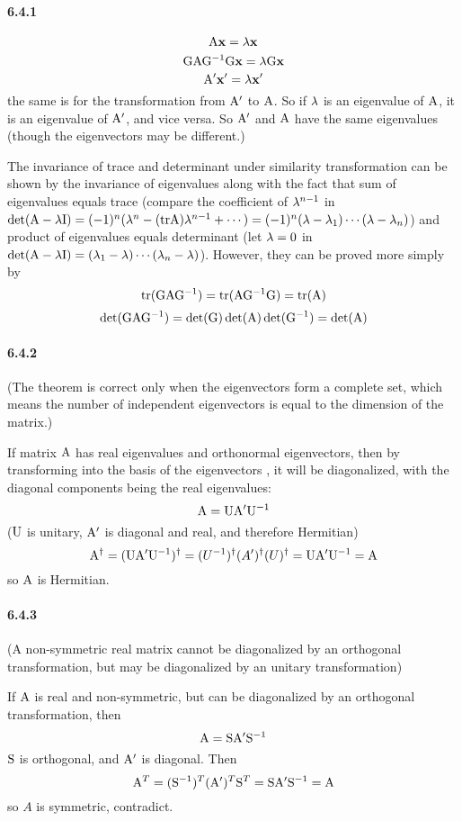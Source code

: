 \documentclass[a4paper]{article}
\begin{document}
\paragraph{6.4.1}
\[
\mathrm{A}\mathbf{x}=\lambda\mathbf{x}
\]
\[
\mathrm{G}\mathrm{A}\mathrm{G}^{-1}\mathrm{G}\mathbf{x}=\lambda\mathrm{G}\mathbf{x}
\]
\[
\mathrm{A}'\mathbf{x}'=\lambda\mathbf{x}'
\]
the same is for the transformation from $\mathrm{A}'$ to $\mathrm{A}$. So if $\lambda$ is an eigenvalue of $\mathrm{A}$, it is an eigenvalue of $\mathrm{A}'$, and vice versa. So $\mathrm{A}'$ and $\mathrm{A}$ have the same eigenvalues (though the eigenvectors may be different.)

The invariance of trace and determinant under similarity transformation can be shown by the invariance of eigenvalues along with the fact that sum of eigenvalues equals trace (compare the coefficient of $\lambda^{n-1}$ in $\det(\mathrm{A}-\lambda \mathrm{I})=(-1)^n(\lambda^n-(\mathrm{tr} \mathrm{A})\lambda^{n-1}+\cdots)=(-1)^n(\lambda-\lambda_1)\cdots(\lambda-\lambda_n)$\;) and product of eigenvalues equals determinant (let $\lambda=0$ in $\det(\mathrm{A}-\lambda \mathrm{I})=(\lambda_1-\lambda)\cdots(\lambda_n-\lambda)$). However, they can be proved more simply by
\newcommand{\tr}{\mathrm{tr}}
\[
\tr(\M{G}\M{A}\M{G}^{-1})=\tr(\M{A}\M{G}^{-1}\M{G})=\tr(\M{A})
\]
\[
\det(\mathrm{G}\mathrm{A}\mathrm{G}^{-1})=\det(\mathrm{G})\det(\mathrm{A})\det(\mathrm{G}^{-1})=\det(\mathrm{A})
\]

\paragraph{6.4.2}
(The theorem is correct only when the eigenvectors form a complete set, which means the number of independent eigenvectors is equal to the dimension of the matrix.)

If matrix $\mathrm{A}$ has real eigenvalues and orthonormal eigenvectors, then by transforming into the basis of the eigenvectors , it will be diagonalized, with the diagonal components being the real eigenvalues:
\[
\mathrm{A}=\mathrm{U}\mathrm{A'}\mathrm{U}^{-1}
\]
($\mathrm{U}$ is unitary, $\mathrm{A'}$ is diagonal and real, and therefore Hermitian)
\[
\mathrm{A}^\dagger=(\mathrm{U}\mathrm{A'}\mathrm{U}^{-1})^\dagger=(U^{-1})^\dagger(A')^\dagger(U)^\dagger=\mathrm{U}\mathrm{A'}\mathrm{U}^{-1}=\mathrm{A}
\]
so $\mathrm{A}$ is Hermitian.

\paragraph{6.4.3}
(A non-symmetric real matrix cannot be diagonalized by an orthogonal transformation, but may be diagonalized by an unitary transformation)

If $\mathrm{A}$ is real and non-symmetric, but can be diagonalized by an orthogonal transformation, then
\[
\mathrm{A}=\mathrm{S}\mathrm{A'}\mathrm{S}^{-1}
\]
$\mathrm{S}$ is orthogonal, and $\mathrm{A'}$ is diagonal. Then
\[
\mathrm{A}^T=(\mathrm{S}^{-1})^T(\mathrm{A'})^T\mathrm{S}^T=\mathrm{S}\mathrm{A'}\mathrm{S}^{-1}=\mathrm{A}
\]
so $A$ is symmetric, contradict.
\end{document}
